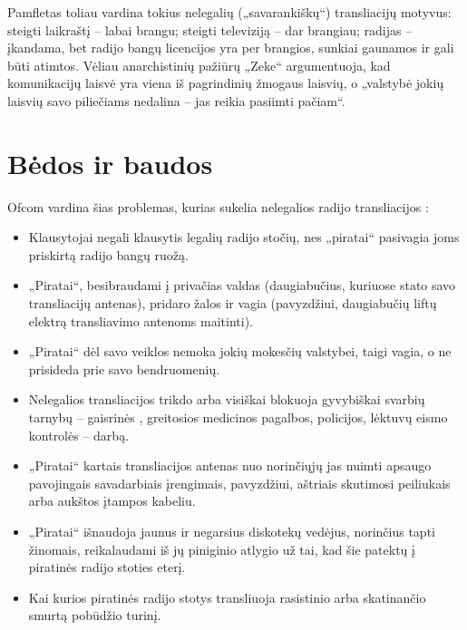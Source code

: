 \documentclass[kursinis-darbas]{vukf}
\begin{document}
Pamfletas toliau vardina tokius nelegalių („savarankiškų“) transliacijų motyvus: steigti laikraštį – labai brangu; steigti televiziją – dar brangiau; radijas – įkandama, bet radijo bangų licencijos yra per brangios, sunkiai gaunamos ir gali būti atimtos. Vėliau anarchistinių pažiūrų „Zeke“ argumentuoja, kad komunikacijų laisvė yra viena iš pagrindinių žmogaus laisvių, o „valstybė jokių laisvių savo piliečiams nedalina – jas reikia pasiimti pačiam“.


\section{Bėdos ir baudos}

\gls{Ofcom} vardina šias problemas, kurias sukelia nelegalios radijo transliacijos \cite{ofcom_pirate_radio_fines} \cite{bbc_radio_4_do_pirates_rule_the_air_waves}:

\begin{itemize}
	\item Klausytojai negali klausytis legalių radijo stočių, nes „piratai“ pasivagia joms priskirtą radijo bangų ruožą.
	\item „Piratai“, besibraudami į privačias valdas (daugiabučius, kuriuose stato savo transliacijų antenas), pridaro žalos ir vagia (pavyzdžiui, daugiabučių liftų elektrą transliavimo antenoms maitinti).
	\item „Piratai“ dėl savo veiklos nemoka jokių mokesčių valstybei, taigi vagia, o ne prisideda prie savo bendruomenių.
	\item Nelegalios transliacijos trikdo arba visiškai blokuoja gyvybiškai svarbių tarnybų – gaisrinės \cite{ofcom_illegal_broadcasting_factsheet}, greitosios medicinos pagalbos, policijos, lėktuvų eismo kontrolės – darbą.
	\item „Piratai“ kartais transliacijos antenas nuo norinčiųjų jas nuimti apsaugo pavojingais savadarbiais įrengimais, pavyzdžiui, aštriais skutimosi peiliukais arba aukštos įtampos kabeliu. \cite{ofcom_illegal_broadcasting_factsheet}
	\item „Piratai“ išnaudoja jaunus ir negarsius diskotekų vedėjus, norinčius tapti žinomais, reikalaudami iš jų piniginio atlygio už tai, kad šie patektų į piratinės radijo stoties eterį. \cite{ofcom_illegal_broadcasting_factsheet}
	\item Kai kurios piratinės radijo stotys transliuoja rasistinio arba skatinančio smurtą pobūdžio turinį. \cite{ofcom_illegal_broadcasting_factsheet}
\end{itemize}
\end{document}
